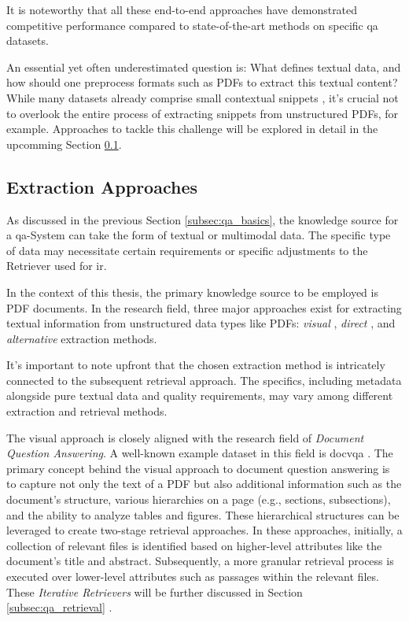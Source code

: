 It is noteworthy that all these end-to-end approaches have demonstrated competitive performance compared to state-of-the-art methods on specific \gls{qa} datasets.

An essential yet often underestimated question is: What defines textual data, and how should one preprocess formats such as PDFs to extract this textual content? While many datasets already comprise small contextual snippets \cite{wang_modern_2022}, it's crucial not to overlook the entire process of extracting snippets from unstructured PDFs, for example. Approaches to tackle this challenge will be explored in detail in the upcomming Section \ref{subsec:qa_indexing}.


\subsection{Extraction Approaches}
\label{subsec:qa_indexing}

As discussed in the previous Section \ref{subsec:qa_basics}, the knowledge source for a \gls{qa}-System can take the form of textual or multimodal data. The specific type of data may necessitate certain requirements or specific adjustments to the Retriever used for \gls{ir}.

In the context of this thesis, the primary knowledge source to be employed is PDF documents. In the research field, three major approaches exist for extracting textual information from unstructured data types like PDFs: \textit{visual} \cite{tito_document_2021}, \textit{direct} \cite{wang_multi-passage_2019}, and \textit{alternative} \cite{dasigi_dataset_2021} extraction methods.

It's important to note upfront that the chosen extraction method is intricately connected to the subsequent retrieval approach. The specifics, including metadata alongside pure textual data and quality requirements, may vary among different extraction and retrieval methods.

The visual approach is closely aligned with the research field of \textit{Document Question Answering}. A well-known example dataset in this field is \gls{docvqa} \cite{tito_document_2021}. The primary concept behind the visual approach to document question answering is to capture not only the text of a PDF but also additional information such as the document's structure, various hierarchies on a page (e.g., sections, subsections), and the ability to analyze tables and figures. These hierarchical structures can be leveraged to create two-stage retrieval approaches. In these approaches, initially, a collection of relevant files is identified based on higher-level attributes like the document's title and abstract. Subsequently, a more granular retrieval process is executed over lower-level attributes such as passages within the relevant files. These \textit{Iterative Retrievers} will be further discussed in Section \ref{subsec:qa_retrieval} \cite{liu_dense_2021}.

